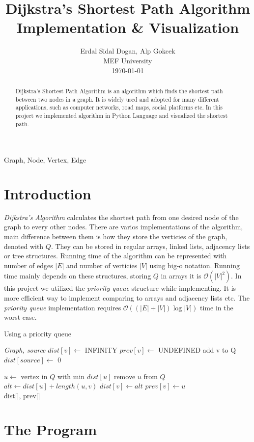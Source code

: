 \documentclass[twocolumns]{IEEEtran}
\author{Erdal Sidal Dogan, Alp Gokcek \\ MEF University \\ \today}
\title{Dijkstra's Shortest Path Algorithm Implementation \& Visualization}
\begin{document}
	\maketitle
	\begin{abstract}
		Dijkstra's Shortest Path Algorithm is an algorithm which finds the shortest path between two nodes in a graph. It is widely used and adopted for many different applications, such as computer networks, road maps, social platforms etc. In this project we implemented algorithm in Python Language and visualized the shortest path.
	\end{abstract}
	\begin{IEEEkeywords}
		Graph, Node, Vertex, Edge
	\end{IEEEkeywords}
	\section{Introduction}
	\textit{Dijkstra's Algorithm} calculates the shortest path from one desired node of the graph to every other nodes. There are varios implementations of the algorithm, main difference between them is how they store the verticies of the graph, denoted with $Q$. They can be stored in regular arrays, linked lists, adjacency lists or tree structures. Running time of the algorithm can be represented with number of edges $|E|$ and number of verticies $|V|$ using big-o notation. Running time mainly depends on these structures, storing $Q$ in arrays it is $\mathcal{O}(|V|^2)$. In this project we utilized the \textit{priority queue} structure while implementing. It is more efficient way to implement comparing to arrays and adjacency lists etc. The \textit{priority queue} implementation requires $\mathcal{O}((|E| + |V|) \log{|V|})$ time in the worst case. 
	\begin{algorithm}
		\caption{Using a priority queue \cite{wiki}}
		\begin{algorithmic}[1]
			 {\textit{Graph, source}}
					\State $dist[v] \leftarrow$ INFINITY                  
					\State $prev[v] \leftarrow$ UNDEFINED
					\State add v to Q                      
				\EndFor
				\State $dist[source] \leftarrow$ 0
	
					\State $u \leftarrow$ vertex in $Q$ with min $dist[u]$
					\State remove $u$ from $Q$
						\State $alt \leftarrow dist[u] + length(u, v)$
							\State $dist[v] \leftarrow alt$
							\State $prev[v] \leftarrow u$
						\EndIf
					\EndFor
				\EndWhile \\
				\Return dist[], prev[]
			\EndFunction
		\end{algorithmic}
	\end{algorithm}

	\section{The Program}

	
	
\end{document}
